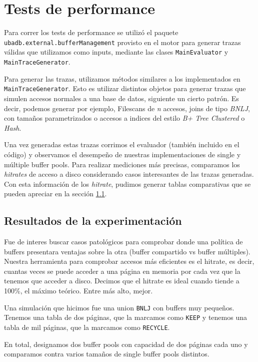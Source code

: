 \section{Tests de performance}
Para correr los tests de performance se utiliz\'o el paquete \texttt{ubadb.external.bufferManagement} provisto en el
motor para generar trazas v\'alidas que utilizamos como inputs, mediante las clases \texttt{MainEvaluator} y \texttt{MainTraceGenerator}.

Para generar las trazas, utilizamos m\'etodos similares a los implementados en \texttt{MainTraceGenerator}. Esto es
utilizar distintos objetos para generar trazas que simulen accesos normales a una base de datos, siguiente un cierto
patr\'on. Es decir, podemos generar por ejemplo, Filescans de \textit{n} accesos, joins de tipo \textit{BNLJ}, con
tama\~nos parametrizados o accesos a indices del estilo \textit{B+ Tree Clustered} o \textit{Hash}.

Una vez generadas estas trazas corrimos el evaluador (tambi\'en incluido en el c\'odigo) y observamos el
desempe\~no de nuestras implementaciones de single y m\'ultiple buffer pools. Para realizar mediciones m\'as
precisas, comparamos los \textit{hitrates} de acceso a disco considerando casos interesantes de las trazas generadas.
Con esta informaci\'on de los \textit{hitrate}, pudimos generar tablas comparativas que se pueden apreciar en la secci\'on \ref{secTablas}.


\subsection{Resultados de la experimentaci\'on}\label{secTablas}

Fue de interes buscar casos patol\'ogicos para comprobar donde una pol\'itica de
buffers presentara ventajas sobre la otra (buffer compartido vs buffer m\'ultiples).
Nuestra herramienta para comprobar accesos m\'as eficientes es el hitrate,
es decir, cuantas veces se puede acceder a una p\'agina en memoria por cada vez que
la tenemos que acceder a disco. Decimos que el hitrate es ideal cuando
tiende a 100\%, el m\'aximo te\'orico. Entre m\'as alto, mejor.

Una simulaci\'on que hicimos fue una union \texttt{BNLJ} con buffers muy peque\~nos.
Tenemos una tabla de dos p\'aginas, que la marcamos como \texttt{KEEP} y tenemos
una tabla de mil p\'aginas, que la marcamos como \texttt{RECYCLE}.

En total, designamos dos buffer pools con capacidad de dos p\'aginas cada uno
y comparamos contra varios tama\~nos de single buffer pools distintos.

